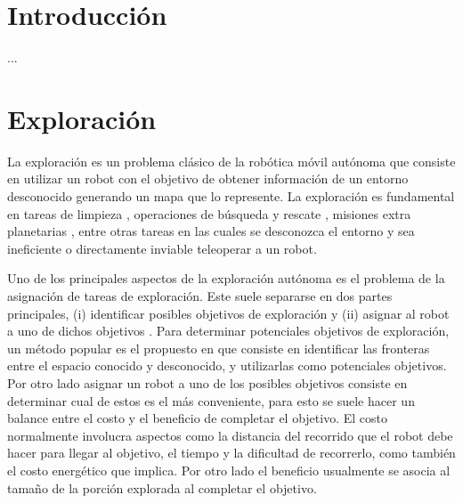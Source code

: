 \section{Introducción}
...
\section{Exploración}\label{sec:exploracion}
La exploración es un problema clásico de la robótica
móvil autónoma que consiste en utilizar un robot con el objetivo de obtener
información de un entorno desconocido generando un mapa que lo represente. La
exploración es fundamental en tareas de limpieza \cite{luo2002real}, operaciones
de búsqueda y rescate \cite{Liu2015}, misiones extra planetarias
\cite{schuster2019towards}, entre otras tareas en las cuales se desconozca
el entorno y sea ineficiente o directamente inviable teleoperar a un robot.

Uno de los principales aspectos de la exploración autónoma es el problema de la
asignación de tareas de exploración. Este suele separarse en dos partes
principales, (i) identificar posibles objetivos de exploración y (ii) asignar
al robot a uno de dichos objetivos \cite{amorin2019novel}. Para determinar
potenciales objetivos de exploración, un método popular es el propuesto en
\cite{yamauchi1998frontier} que consiste en identificar las fronteras entre el
espacio conocido y desconocido, y utilizarlas como potenciales objetivos. Por
otro lado asignar un robot a uno de los posibles objetivos consiste en
determinar cual de estos es el más conveniente, para esto se suele hacer un
balance entre el costo y el beneficio de completar el objetivo. El costo
normalmente involucra aspectos como la distancia del recorrido que el robot
debe hacer para llegar al objetivo, el tiempo y la dificultad de recorrerlo,
como también el costo energético que implica. Por otro lado el beneficio
usualmente se asocia al tamaño de la porción explorada al completar el
objetivo. %

